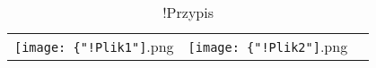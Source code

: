 \begin{table}[ht]
\begin{tabularx}{1\textwidth}{@{\hspace{1.7 mm}}Xcc@{\hspace{1.7 mm}}}
\texttt{[image: \{"!Plik1"]}.png}
&
  \texttt{[image: \{"!Plik2"]}.png}  \\
\end{tabularx}
\caption{!Przypis}
\end{table}

